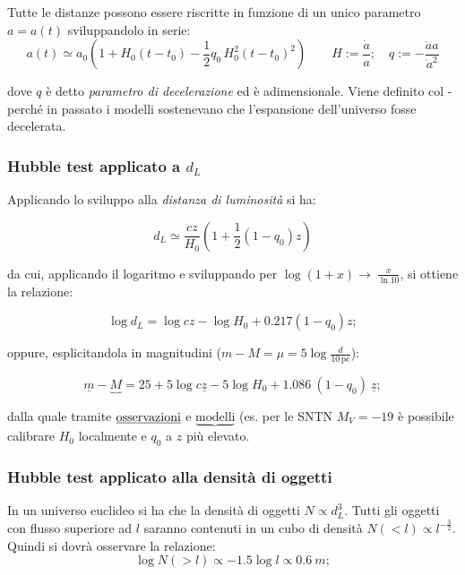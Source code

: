 Tutte le distanze possono essere riscritte in funzione di un unico
parametro $a=a(t)$ sviluppandolo in serie:
\begin{equation}
a(t)\simeq a_0\left ( 1+H_0 (t-t_0)-\frac{1}{2}q_0\,H_0^2(t-t_0)^2  \right )\qquad 
H:=\frac{\dot{a}}{a}; \quad
q:=-\frac{\ddot{a} a}{\dot{a}^2} 
\end{equation}

dove $q$ è detto \emph{parametro di decelerazione} ed è adimensionale. Viene definito col - perché in passato i modelli sostenevano che l'espansione dell'universo fosse decelerata. 

\subsubsection{Hubble test applicato a $d_L$}
Applicando lo sviluppo alla \emph{distanza di luminosità} si ha:

\begin{equation}
d_L\simeq \frac{cz}{H_0}\left ( 1 + \frac{1}{2}(1-q_0)z  \right )
\end{equation}

da cui, applicando il logaritmo e sviluppando per \(\log\left(1+x\right)\rightarrow\ \frac{x}{\ln10}\), si
ottiene la relazione:

\begin{equation}
\log d_L = \log cz-\log H_0+0.217(1-q_0)z;
\end{equation}

oppure, esplicitandola in magnitudini ($ m-M=\mu=5\log\frac{d}{\mathrm{10\,pc}} $):

\begin{equation}
\underline{m} - \underbrace{M} = 25 + 5\log c\underline{z}-5\log H_0 + 1.086~(1-q_0)~\underline{z};
\end{equation}

dalla quale tramite $\textrm{\underline{osservazioni}}$ e $\underbrace{\textrm{modelli}} $ (es. per le SNTN $M_V=-19$ è possibile calibrare $H_0$ localmente e $q_0$ a $z$ più elevato.

\subsubsection{Hubble test applicato alla densità di oggetti}
In un universo euclideo si ha che la densità di oggetti $N\propto d_L^3$. Tutti gli oggetti con flusso superiore ad $l$ saranno contenuti in un cubo di densità $N(<l)\propto l^{-\frac{3}{2}}$. Quindi si dovrà osservare la relazione: 
\begin{equation}
\log N(>l) \propto -1.5 \log l \propto 0.6~m;
\end{equation}

